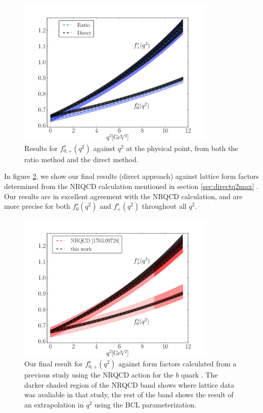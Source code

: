 \begin{figure}[htb!]
  \begin{center}
  \includegraphics[width=0.85\textwidth]{images/BsDs/ratio_vs_direct.pdf}
  \caption{ Results for $f_{0,+}^s(q^2)$ against $q^2$ at the physical point, from both the ratio method and the direct method. \label{fig:ratiovsdirect}}
    \end{center}
\end{figure}

In figure \ref{fig:nrqcd}, we show our final results (direct approach) against lattice form factors determined from the NRQCD calculation mentioned in section \ref{sec:directq2max} \cite{Monahan:2017uby}. Our results are in excellent agreement with the NRQCD calculation, and are more precise for both $f^s_0(q^2)$ and $f^s_+(q^2)$ throughout all $q^2$.

\begin{figure}[htb!]
\begin{center}
  \includegraphics[width=0.85\textwidth]{images/BsDs/nrqcd_comparison.pdf}
  \caption{ Our final result for $f_{0,+}^s(q^2)$ against form factors calculated from a previous study using the NRQCD action for the $b$ quark  \cite{Monahan:2017uby}. The darker shaded region of the NRQCD band shows where lattice data was avaliable in that study, the rest of the band shows the result of an extrapolation in $q^2$ using the BCL parameterization.\label{fig:nrqcd}}
  \end{center}
\end{figure}


